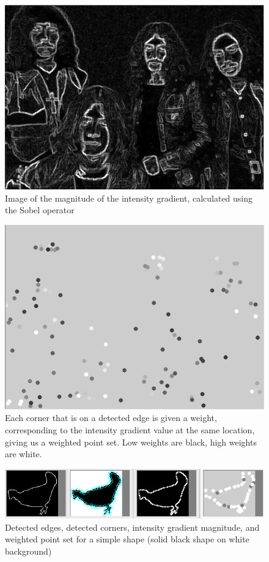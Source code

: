 \documentclass[10pt,a4paper]{article}
\begin{document}
\begin{figure}[ht!]
\centering
\includegraphics{sobel_intensity_gradient.png}
\caption{Image of the magnitude of the intensity gradient, calculated using the Sobel operator}
\label{fig:sobel}
\end{figure}

\begin{figure}[ht!]
\centering
\includegraphics{weighted_point_set.png}
\caption{Each corner that is on a detected edge is given a weight, corresponding to the intensity gradient value at the same location, giving us a weighted point set. Low weights are black, high weights are white.}
\label{fig:pointset}
\end{figure}

\begin{figure}[ht!]
\centering
\includegraphics{bird_points.png}
\caption{Detected edges, detected corners, intensity gradient magnitude, and weighted point set for a simple shape (solid black shape on white background)}
\label{overflow}
\end{figure}
\end{document}
